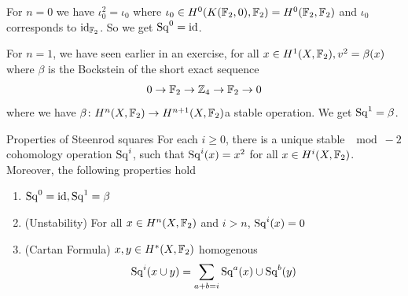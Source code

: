 \documentclass[language=english]{TemplateLecture}
\begin{document}
\begin{example}
    For \(n = 0\) we have \(\iota_0^2 = \iota_0\) where \(\iota_0 \in H^0(K(\mathbb{F}_2, 0), \mathbb{F}_2) = H^0(\mathbb{F}_2, \mathbb{F}_2)\) and \(\iota_0\) corresponds to \(\operatorname{id}_{\mathbb{F}_2}\). So we get \(\mathrm{Sq}^0 = \operatorname{id}\).

    For \(n = 1\), we have seen earlier in an exercise, for all \(x \in H^1(X,\mathbb{F}_2), v^2 = \beta(x)\) where \(\beta\) is the Bockstein of the short exact sequence
    \[0 \to \mathbb{F}_2 \to \mathbb{Z}_4 \to \mathbb{F}_2 \to 0\]
    where we have \(\beta\colon H^n(X,\mathbb{F}_2)\to H^{n+1}(X, \mathbb{F}_2)\)a stable operation. We get \(\mathrm{Sq}^1= \beta\).
\end{example}

\begin{thm}{Properties of Steenrod squares}{}
    For each \(i\geq 0\), there is a unique stable \(\mod -2\) cohomology operation \(\mathrm{Sq}^i\), such that \(\mathrm{Sq}^i(x) = x^2\) for all \(x\in H^i(X,\mathbb{F}_2)\). Moreover, the following properties hold
    \begin{enumerate}
        \item \(\mathrm{Sq}^0 = \operatorname{id}, \mathrm{Sq}^1 = \beta\)
        \item (Unstability) For all \(x\in H^n(X, \mathbb{F}_2)\) and \(i> n\), \(\mathrm{Sq}^i(x) = 0\)
        \item (Cartan Formula) \(x,y \in H^*(X, \mathbb{F}_2)\) homogenous
        \[\mathrm{Sq}^i(x\cup y) = \sum_{a+b = i}\mathrm{Sq}^a(x)\cup \mathrm{Sq}^b(y)\]
    \end{enumerate}
\end{thm}
\end{document}
